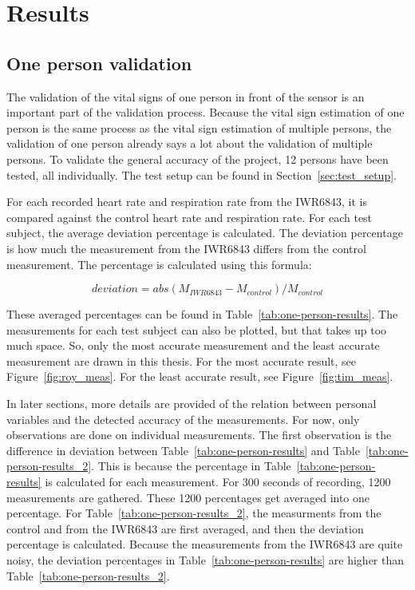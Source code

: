 \section{Results}
\subsection{One person validation}
\label{sec:one_pers_validation}
The validation of the vital signs of one person in front of the sensor is an important part of the validation process. Because the vital sign estimation of one person is the same process as the vital sign estimation of multiple persons, the validation of one person already says a lot about the validation of multiple persons. To validate the general accuracy of the project, 12 persons have been tested, all individually. The test setup can be found in Section~\ref{sec:test_setup}. 

For each recorded heart rate and respiration rate from the IWR6843, it is compared against the control heart rate and respiration rate. For each test subject, the average deviation percentage is calculated. The deviation percentage is how much the measurement from the IWR6843 differs from the control measurement. The percentage is calculated using this formula:

\begin{equation}
    deviation = abs(M_{IWR6843} - M_{control}) / M_{control}
    \label{eq:deviation_calculation}
\end{equation}

These averaged percentages can be found in Table~\ref{tab:one-person-results}. The measurements for each test subject can also be plotted, but that takes up too much space. So, only the most accurate measurement and the least accurate measurement are drawn in this thesis. For the most accurate result, see Figure~\ref{fig:roy_meas}. For the least accurate result, see Figure~\ref{fig:tim_meas}.

In later sections, more details are provided of the relation between personal variables and the detected accuracy of the measurements. For now, only observations are done on individual measurements. The first observation is the difference in deviation between Table~\ref{tab:one-person-results} and Table~\ref{tab:one-person-results_2}. This is because the percentage in Table~\ref{tab:one-person-results} is calculated for each measurement. For 300 seconds of recording, 1200 measurements are gathered. These 1200 percentages get averaged into one percentage. For Table~\ref{tab:one-person-results_2}, the measurments from the control and from the IWR6843 are first averaged, and then the deviation percentage is calculated. Because the measurements from the IWR6843 are quite noisy, the deviation percentages in Table~\ref{tab:one-person-results} are higher than Table~\ref{tab:one-person-results_2}.

